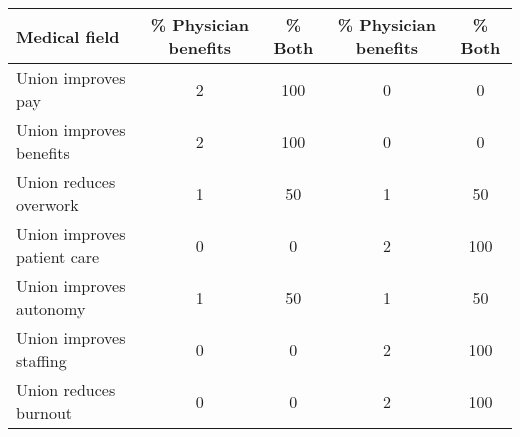 \begin{tabular}{lcccc}\toprule
\cmidrule(lr){2-3} \cmidrule(lr){4-5}
Medical field & \% Physician benefits & \% Both & \% Physician benefits & \% Both \\ \midrule
Union improves pay & 2 & 100 & 0 & 0 \\
Union improves benefits & 2 & 100 & 0 & 0 \\
Union reduces overwork & 1 & 50 & 1 & 50 \\
\midrule
Union improves patient care & 0 & 0 & 2 & 100 \\
Union improves autonomy & 1 & 50 & 1 & 50 \\
Union improves staffing & 0 & 0 & 2 & 100 \\
\midrule
Union reduces burnout & 0 & 0 & 2 & 100 \\
\bottomrule\end{tabular}
